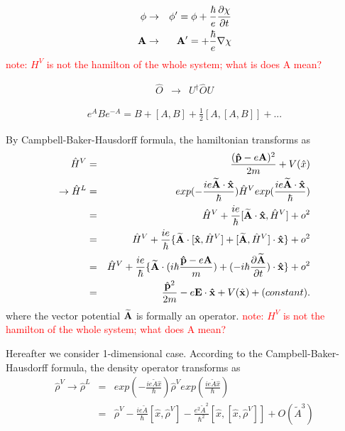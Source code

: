 \documentclass[aps,prb,preprint]{revtex4-1}
\begin{document}
\begin{appendix}
\begin{eqnarray}
\phi &\rightarrow& \phi' = \phi +\frac{\hbar}{e} \frac{\partial \chi}{\partial t} \\
{\bf A} &\rightarrow& {\bf A}' = +\frac{\hbar}{e} {\bf \nabla} \chi
\end{eqnarray} 
\textcolor{red}{note: $H^V$ is not the hamilton of the whole system; what is does A mean?}

\begin{eqnarray}
\hat{O} &\rightarrow& U^{\dag} \hat{O} U \nonumber 
\end{eqnarray} 

\begin{eqnarray}
e^A B e^{-A} = B+ [A,B] +\frac{1}{2}[A,[A,B]] + ... \nonumber  
\end{eqnarray} 

By Campbell-Baker-Hausdorff formula, the hamiltonian transforms as  
\begin{eqnarray}
\hat{H}^V &=& \frac{ ({\bf \hat{p}} - e{\bf A})^2 }{2m} + V(\hat{x}) \nonumber \nonumber \\ 
\rightarrow \hat{H}^L &=& exp(-\frac{ i e {\bf \widetilde{A} \cdot \hat{x}} }{\hbar}) \hat{H}^V exp( \frac{ i e {\bf \widetilde{A} \cdot \hat{x}}}{\hbar}) \nonumber \\
&=& \hat{H}^V + \frac{i e}{\hbar}[{\bf \widetilde{A} \cdot \hat{x} }, \hat{H}^V] + o^2 \nonumber \\
&=& \hat{H}^V + \frac{i e}{\hbar} \{ {\bf \widetilde{A}} \cdot [ {\bf \hat{x} }, \hat{H}^V] + [ {\bf \widetilde{A}} , \hat{H}^V] \cdot {\bf \hat{x} } \}+ o^2 \nonumber \\
&=& \hat{H}^V + \frac{i e}{\hbar} \{ {\bf \widetilde{A}} \cdot (i \hbar \frac{{\bf \hat{p}} - e{\bf A}}{m}) + (- i \hbar \frac{\partial \widetilde{\bf A}}{\partial t}) \cdot {\bf \hat{x} } \}+ o^2 \nonumber \\
&=& \frac{ \hat{\bf p}^2 }{2m} -e {\bf E \cdot \hat{\bf x}} + V(\hat{\bf x})+ (constant).\nonumber \\
\end{eqnarray} 
where the vector potential ${\bf \widetilde{A}}$ is formally an operator. 
\textcolor{red}{note: $H^V$ is not the hamilton of the whole system; what does A mean?}

Hereafter we consider 1-dimensional case.
According to the Campbell-Baker-Hausdorff formula, the density operator transforms as 
\begin{eqnarray}
\hat{\rho}^V \rightarrow \hat{\rho}^L &=& exp(-\frac{ i e \widetilde{A} \hat{x} }{\hbar}) \hat{\rho}^V exp(\frac{ i e \widetilde{A} \hat{x} }{\hbar})\nonumber \\
&=& \hat{\rho}^V -\frac{ i e \widetilde{A}}{\hbar} [\hat{x}, \hat{\rho}^V ] - \frac{ e^2 \widetilde{A}^2}{\hbar^2} [ \hat{x}, [\hat{x}, \hat{\rho}^V ] ]+ O(\widetilde{A}^3)
\end{eqnarray} 



\end{appendix}
\end{document}

